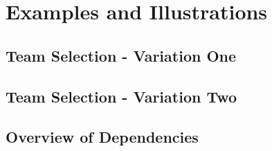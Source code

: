 \documentclass[10pt,a4paper]{scrartcl}
\begin{document}
\iffalse

\title{Mathematical Theory of Data}
\subtitle{Simple ER models and Relational Schema}
\author{John Cartmell}
\maketitle
\begin{center}
DRAFT
\end{center}










\fi
\newpage
\appendix

\iffalse

\fi

\section{Examples and Illustrations}





\subsection{Team Selection - Variation One}



\subsection{Team Selection - Variation Two}



\begin{landscape}
\section{Overview of Dependencies}

\end{landscape}
%
 

	 
\end{document}
